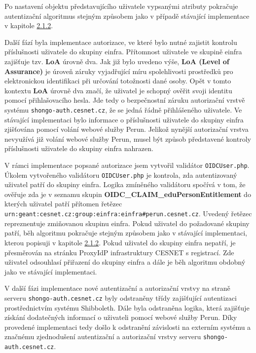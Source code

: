 \documentclass[
  printed, %
  twoside, %
  table,   %
  nolof,     %
  nolot,     %
]{fithesis3}
\begin{document}
Po nastavení objektu představujícího uživatele vypsanými atributy pokračuje autentizační algoritmus stejným způsobem jako v případě stávající implementace v kapitole \hyperref[meetings-old]{2.1.2}.

\par

Další fází byla implementace autorizace, ve které bylo nutné zajistit kontrolu příslušnosti uživatele do skupiny einfra. Přítomnost uživatele ve skupině einfra zajišťuje tzv. \textbf{LoA} úrovně dva. Jak již bylo uvedeno výše, \textbf{LoA (Level of Assurance)} je úroveň záruky vyjadřující míru spolehlivosti prostředků pro elektronickou identifikaci při určování totožnosti dané osoby. Opět v tomto kontextu \textbf{LoA} úrovně dva značí, že uživatel je schopný ověřit svoji identitu pomocí přihlašovacího hesla. Jde tedy o bezpečnostní záruku autorizační vrstvě systému \texttt{shongo-auth.cesnet.cz}, že se jedná řádně přihlášeného uživatele. Ve stávající implementaci bylo informace o příslušnosti uživatele do skupiny einfra zjišťována pomocí volání webové služby Perun. Jelikož nynější autorizační vrstva nevyužívá již volání webové služby Perun, musel být způsob představené kontroly příslušnosti uživatele do skupiny einfra nahrazen. 

\par

V rámci implementace popsané autorizace jsem vytvořil validátor \texttt{OIDCUser.php}. Úkolem vytvořeného validátoru \texttt{OIDCUser.php} je kontrola, zda autentizovaný uživatel patří do skupiny einfra. Logika zmíněného validátoru spočívá v tom, že ověřuje zda je v seznamu skupin \textbf{OIDC\_CLAIM\_eduPersonEntitlement} do kterých uživatel patří přítomen řetězec \texttt{urn:geant:cesnet.cz:group:einfra:einfra\#perun.cesnet.cz}. Uvedený řetězec repreznentuje zmiňovanou skupinu einfra. Pokud uživatel do požadované skupiny patří, běh algoritmu pokračuje stejným způsobem jako v stávající implementaci, kterou popisuji v kapitole \hyperref[meetings-old]{2.1.2}. Pokud uživatel do skupiny einfra nepatří, je přesměrován na stránku ProxyIdP infrastruktury CESNET s registrací. Zde uživatel odsouhlasí přiřazení do skupiny einfra a dále je běh algoritmu obdobný jako ve stávající implementaci.     

\par

V další fázi implementace nové autentizační a autorizační vrstvy na straně serveru \texttt{shongo-auth.cesnet.cz} byly odstraněny třídy zajišťující autentizaci prostřednictvím systému Shibboleth. Dále byla odstraněna logika, která zajišťuje získání dodatečných informací o uživateli pomocí webové služby Perun. Díky provedené implementaci tedy došlo k odstranění závislosti na externím systému a značnému zjednodušení autentizační a autorizační vrstvy serveru \texttt{shongo-auth.cesnet.cz}.
\end{document}
